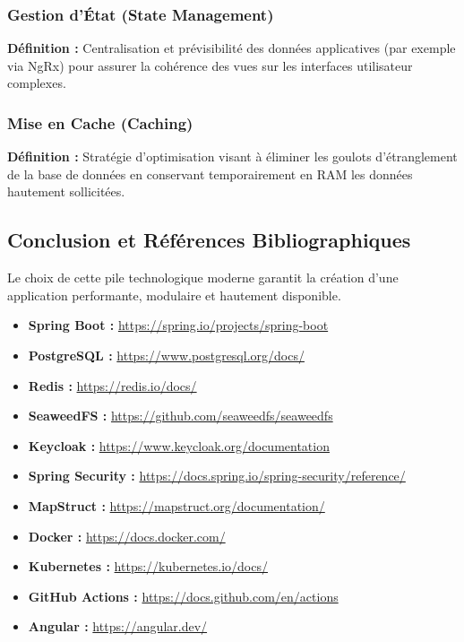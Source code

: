 \documentclass[a4paper,12pt]{article}
\begin{document}
\subsubsection{Gestion d'État (State Management)}
\textbf{Définition :} Centralisation et prévisibilité des données applicatives (par exemple via NgRx) pour assurer la cohérence des vues sur les interfaces utilisateur complexes.

\subsubsection{Mise en Cache (Caching)}
\textbf{Définition :} Stratégie d'optimisation visant à éliminer les goulots d'étranglement de la base de données en conservant temporairement en RAM les données hautement sollicitées.

\subsection{Conclusion et Références Bibliographiques}
Le choix de cette pile technologique moderne garantit la création d'une application performante, modulaire et hautement disponible.

\begin{itemize}[label=$\bullet$]
    \item \textbf{Spring Boot :} \url{https://spring.io/projects/spring-boot}
    \item \textbf{PostgreSQL :} \url{https://www.postgresql.org/docs/}
    \item \textbf{Redis :} \url{https://redis.io/docs/}
    \item \textbf{SeaweedFS :} \url{https://github.com/seaweedfs/seaweedfs}
    \item \textbf{Keycloak :} \url{https://www.keycloak.org/documentation}
    \item \textbf{Spring Security :} \url{https://docs.spring.io/spring-security/reference/}
    \item \textbf{MapStruct :} \url{https://mapstruct.org/documentation/}
    \item \textbf{Docker :} \url{https://docs.docker.com/}
    \item \textbf{Kubernetes :} \url{https://kubernetes.io/docs/}
    \item \textbf{GitHub Actions :} \url{https://docs.github.com/en/actions}
    \item \textbf{Angular :} \url{https://angular.dev/}
\end{itemize}
\end{document}
